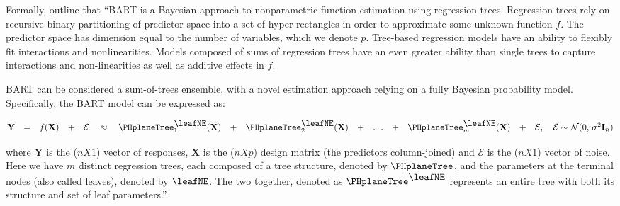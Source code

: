 \documentclass[alpha-refs,fleqn]{wiley-article_p2}
\newcommand\mytree{\mbox{\PHplaneTree}}
\newcommand\mytreel{
\mytree^{\mbox{\leafNE}}}
\begin{document}
Formally, \cite{Kapelner_2016} outline that ``BART is a Bayesian approach to nonparametric function estimation using regression trees. Regression trees rely on recursive binary partitioning of predictor space into a set of hyper-rectangles in order to approximate some unknown function $f$. The predictor space has dimension equal to the number of variables, which we denote $p$. Tree-based regression models have an ability to flexibly fit interactions and nonlinearities. Models composed of sums of regression trees have an even greater ability than single trees to capture interactions and non-linearities as well as additive effects in $f$. 

BART can be considered a sum-of-trees ensemble, with a novel estimation approach relying on a fully Bayesian probability model.  Specifically, the BART model can be expressed as:

\begin{equation}
\textbf{Y} \hspace{1em} $=$ \hspace{1em} f(\textbf{X}) \hspace{1em} $+$ \hspace{1em} \mathcal{E} \hspace{1em} \approx \hspace{1em} \mytreel_{1}(\textbf{X}) \hspace{1em} $+$  \hspace{1em}\mytreel_{2}(\textbf{X}) \hspace{1em} $+$ \hspace{1em} \ldots \hspace{1em} $+$ \hspace{1em} \mytreel_{m}(\textbf{X}) \hspace{1em} $+$ \hspace{1em} \mathcal{E}, \hspace{1em} \mathcal{E}  \sim \mathcal{N}(0,\,\sigma^{2}\textbf{I}_{n})
\end{equation} 

where $\textbf{Y}$ is the ($n X 1$) vector of responses, $\textbf{X}$ is the ($n X p$) design matrix (the predictors column-joined) and $\mathcal{E}$ is the ($n X 1$) vector of noise. Here we have $m$ distinct regression trees, each composed of a tree structure, denoted by $\mytree{}$, and the parameters at the terminal nodes (also called leaves), denoted by $\mbox{\leafNE}$. The two together, denoted as $\mytreel$ represents an entire tree with both its structure and set of leaf parameters.''
\end{document}
